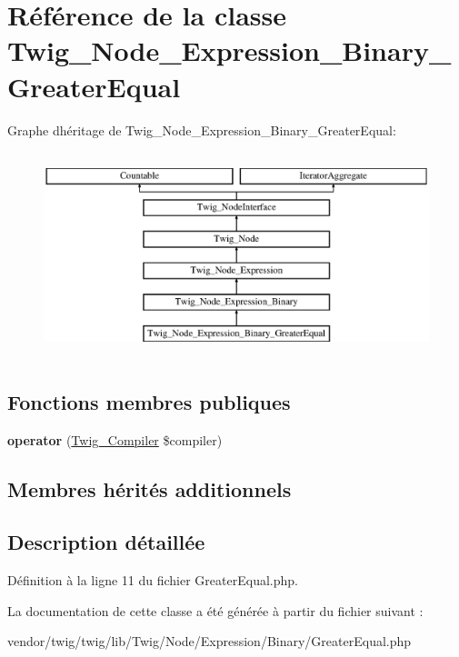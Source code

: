 \hypertarget{class_twig___node___expression___binary___greater_equal}{}\section{Référence de la classe Twig\+\_\+\+Node\+\_\+\+Expression\+\_\+\+Binary\+\_\+\+Greater\+Equal}
\label{class_twig___node___expression___binary___greater_equal}
Graphe d\textquotesingle{}héritage de Twig\+\_\+\+Node\+\_\+\+Expression\+\_\+\+Binary\+\_\+\+Greater\+Equal\+:\begin{figure}[H]
\begin{center}
\leavevmode
\includegraphics[height=6.000000cm]{class_twig___node___expression___binary___greater_equal}
\end{center}
\end{figure}
\subsection*{Fonctions membres publiques}
\begin{DoxyCompactItemize}
\item 
{\bfseries operator} (\hyperlink{class_twig___compiler}{Twig\+\_\+\+Compiler} \$compiler)\hypertarget{class_twig___node___expression___binary___greater_equal_af77318ec88d5f8a508684970a150b670}{}\label{class_twig___node___expression___binary___greater_equal_af77318ec88d5f8a508684970a150b670}

\end{DoxyCompactItemize}
\subsection*{Membres hérités additionnels}


\subsection{Description détaillée}


Définition à la ligne 11 du fichier Greater\+Equal.\+php.



La documentation de cette classe a été générée à partir du fichier suivant \+:\begin{DoxyCompactItemize}
\item 
vendor/twig/twig/lib/\+Twig/\+Node/\+Expression/\+Binary/Greater\+Equal.\+php\end{DoxyCompactItemize}
